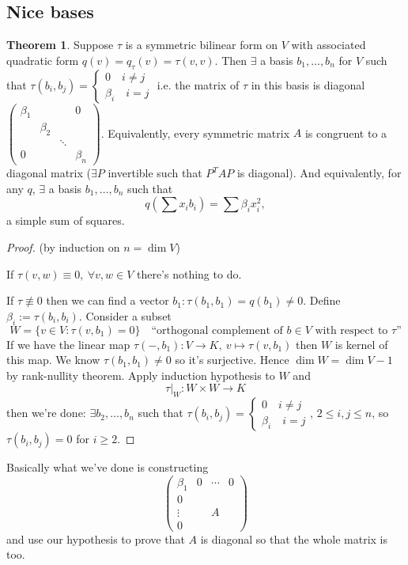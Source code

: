 \documentclass[a4paper]{article}
\theoremstyle{definition}
\newtheorem{thm}[defn]{Theorem}
\begin{document}
\subsection{Nice bases}
\begin{thm}
Suppose $\tau$ is a symmetric bilinear form on $V$ with associated quadratic form $q(v)=q_\tau (v)=\tau (v,v).$ Then $\exists$ a basis $b_1,\ldots ,b_n$ for $V$ such that $\tau (b_i,b_j) = \left\{\begin{aligned}0\quad i\neq j \\ \beta_i \quad i=j \end{aligned} \right.$ i.e. the matrix of $\tau$ in this basis is diagonal $\begin{pmatrix} \beta_1 & & & 0 \\ & \beta_2 & & \\ & & \ddots & \\ 0 & & & \beta_n\end{pmatrix}$. Equivalently, every symmetric matrix $A$ is congruent to a diagonal matrix ($\exists P$ invertible such that $P^TAP$ is diagonal). And equivalently, for any $q$, $\exists$ a basis $b_1,\ldots ,b_n$ such that
\[
q\left(\sum x_i b_i\right)=\sum \beta_i x_i^2 ,
\]
a simple sum of squares.
\end{thm}
\begin{proof} (by induction on $n=\dim V$)

If $\tau (v,w)\equiv 0,\ \forall v,w\in V$ there's nothing to do.

If $\tau \not\equiv 0$ then we can find a vector $b_1 : \tau (b_1,b_1)=q(b_1)\neq 0$. Define $\beta_i := \tau (b_i,b_i).$ Consider a subset
\[
W=\{v\in V : \tau (v,b_1)=0\} \quad \text{``orthogonal complement of } b\in V\text{ with respect to }\tau \text{''}
\]
If we have the linear map $\tau(-,b_1):V\rightarrow K,\ v\mapsto \tau(v,b_1)$ then $W$ is kernel of this map. We know $\tau (b_1,b_1)\neq 0$ so it's surjective. Hence $\dim W=\dim V-1$ by rank-nullity theorem. Apply induction hypothesis to $W$ and
\[
\left.\tau\right|_W : W\times W \rightarrow K
\]
then we're done: $\exists b_2,\ldots,b_n$ such that $\tau (b_i,b_j)=\left\{\begin{aligned}0\quad i\neq j \\ \beta_i \quad i=j \end{aligned} \right.$, $2\leq i,j \leq n$, so $\tau (b_i,b_j)=0$ for $i\geq 2$.
\end{proof}
Basically what we've done is constructing
\[
\begin{pmatrix}\beta_1 & 0 & \cdots & 0 \\ 0 \\ \vdots & & A \\ 0\end{pmatrix}
\]
and use our hypothesis to prove that $A$ is diagonal so that the whole matrix is too.
\end{document}
